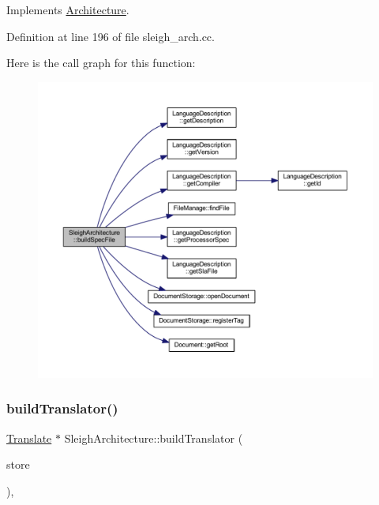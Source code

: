 Implements \mbox{\hyperlink{class_architecture_ad9e8edfa21e63d4b37b8003397804933}{Architecture}}.



Definition at line 196 of file sleigh\+\_\+arch.\+cc.

Here is the call graph for this function\+:
\nopagebreak
\begin{figure}[H]
\begin{center}
\leavevmode
\includegraphics[width=350pt]{class_sleigh_architecture_a80e8e72ca0059be816575262b7db395f_cgraph}
\end{center}
\end{figure}
\mbox{\label{class_sleigh_architecture_aae195ea2828d13b6e15d16c722d14b18}} 
\subsubsection{\texorpdfstring{buildTranslator()}{buildTranslator()}}
{\footnotesize\ttfamily \mbox{\hyperlink{class_translate}{Translate}} $\ast$ Sleigh\+Architecture\+::build\+Translator (\begin{DoxyParamCaption}\item[{\mbox{\hyperlink{class_document_storage}{Document\+Storage}} \&}]{store }\end{DoxyParamCaption})\hspace{0.3cm}{\ttfamily [protected]}, {\ttfamily [virtual]}}



